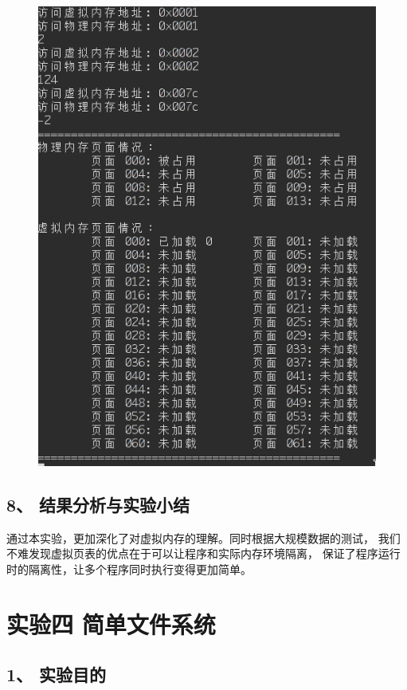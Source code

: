 \documentclass[12bp]{guo}
\begin{document}
\begin{figure}[h!]
    \centering
        \includegraphics[scale=0.75]{figures/3.result.png}
\end{figure}

\subsection{8、 结果分析与实验小结}

通过本实验，更加深化了对虚拟内存的理解。同时根据大规模数据的测试，
我们不难发现虚拟页表的优点在于可以让程序和实际内存环境隔离，
保证了程序运行时的隔离性，让多个程序同时执行变得更加简单。

\clearpage

\section{实验四 简单文件系统}

\subsection{1、 实验目的}
\end{document}
